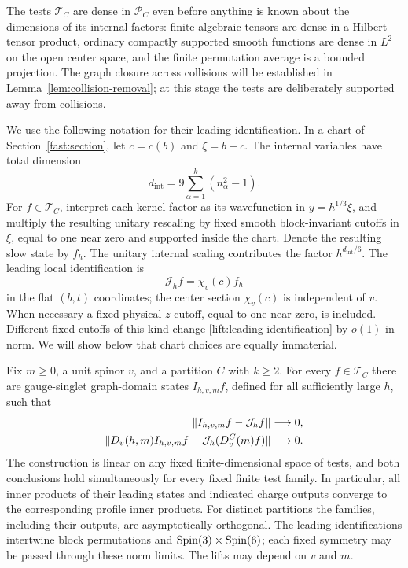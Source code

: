 The tests $\mathcal T_C$ are dense in $\mathcal P_C$ even before
anything is known about the dimensions of its internal factors:
finite algebraic tensors are dense in a Hilbert tensor product,
ordinary compactly supported smooth functions are dense in $L^2$ on
the open center space, and the finite permutation average is a
bounded projection. The graph closure across collisions will be
established in Lemma~\ref{lem:collision-removal}; at this stage the
tests are deliberately supported away from collisions.

We use the following notation for their leading identification. In
a chart of Section~\ref{fast:section}, let $c=c(b)$ and $\xi=b-c$.
The internal variables have total dimension
\[
 d_{\mathrm{int}}=9\sum_{\alpha=1}^k(n_\alpha^2-1).
\]
For $f\in\mathcal T_C$, interpret each kernel factor as its wavefunction
in $y=h^{1/3}\xi$, and multiply the resulting unitary rescaling by
fixed smooth block-invariant cutoffs in $\xi$, equal to one near zero
and supported inside the chart. Denote the resulting slow state by
$f_h$. The unitary internal scaling contributes the factor
$h^{d_{\mathrm{int}}/6}$. The leading local identification is
\begin{equation}
 \mathcal J_hf=\chi_v(c)f_h
 \label{lift:leading-identification}
\end{equation}
in the flat $(b,t)$ coordinates; the center section $\chi_v(c)$ is
independent of $v$. When necessary a fixed physical $z$ cutoff,
equal to one near zero, is included. Different fixed cutoffs of
this kind change \eqref{lift:leading-identification} by $o(1)$ in
norm. We will show below that chart choices are equally immaterial.

\begin{proposition}\label{prop:test-lifts}
Fix $m\geq0$, a unit spinor $v$, and a partition $C$ with $k\geq2$.
For every $f\in\mathcal T_C$ there are gauge-singlet graph-domain
states $I_{h,v,m}f$, defined for all sufficiently large $h$, such that
\begin{align}
 \|I_{h,v,m}f-\mathcal J_hf\|&\longrightarrow0,\notag\\
 \|D_v(h,m)I_{h,v,m}f-
                  \mathcal J_h(D_v^C(m)f)\|&\longrightarrow0.
 \label{lift:graph-convergence}
\end{align}
The construction is linear on any fixed finite-dimensional space
of tests, and both conclusions hold simultaneously for every fixed
finite test family. In particular, all inner products of their
leading states and indicated charge outputs converge to the
corresponding profile inner products. For distinct partitions the
families, including their outputs, are asymptotically orthogonal.
The leading identifications intertwine block permutations and
$\operatorname{Spin}(3)\times\operatorname{Spin}(6)$; each fixed symmetry may be passed through
these norm limits. The lifts may depend on $v$ and $m$.
\end{proposition}

